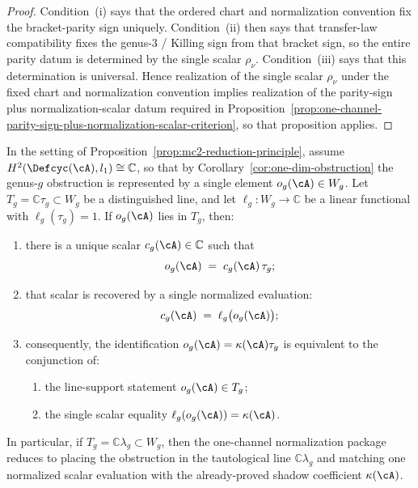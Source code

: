 \begin{proof}
Condition~\textup{(i)} says that the ordered chart and normalization
convention fix the bracket-parity sign uniquely.  Condition~\textup{(ii)}
then says that transfer-law compatibility fixes the genus-$3$ /
Killing sign from that bracket sign, so the entire parity datum is
determined by the single scalar
$\rho_{\nu}$.
Condition~\textup{(iii)} says that this determination is universal.
Hence realization of the single scalar
$\rho_{\nu}$
under the fixed chart and normalization convention implies realization
of the parity-sign plus normalization-scalar datum required in
Proposition~\ref{prop:one-channel-parity-sign-plus-normalization-scalar-criterion},
so that proposition applies.
\end{proof}

\begin{proposition}\label{prop:one-channel-normalization-criterion}
In the setting of
Proposition~\textup{\ref{prop:mc2-reduction-principle}}, assume
$H^2(\Defcyc(\cA), l_1) \cong \mathbb{C}$, so that by
Corollary~\textup{\ref{cor:one-dim-obstruction}} the genus-$g$
obstruction is represented by a single element
$o_g(\cA) \in W_g$.
Let $T_g = \mathbb{C}\tau_g \subset W_g$ be a distinguished line, and
let $\ell_g\colon W_g \to \mathbb{C}$ be a linear functional with
$\ell_g(\tau_g)=1$.
If $o_g(\cA)$ lies in $T_g$, then:
\begin{enumerate}[label=\textup{(\roman*)}]
\item there is a unique scalar $c_g(\cA) \in \mathbb{C}$ such that
  \[
  o_g(\cA) \;=\; c_g(\cA)\,\tau_g;
  \]
\item that scalar is recovered by a single normalized evaluation:
  \[
  c_g(\cA) \;=\; \ell_g\bigl(o_g(\cA)\bigr);
  \]
\item consequently, the identification
  $o_g(\cA)=\kappa(\cA)\tau_g$ is equivalent to the conjunction of:
  \begin{enumerate}[label=\textup{(\alph*)}]
  \item the line-support statement $o_g(\cA)\in T_g$;
  \item the single scalar equality
    $\ell_g(o_g(\cA))=\kappa(\cA)$.
  \end{enumerate}
\end{enumerate}
In particular, if $T_g=\mathbb{C}\lambda_g \subset W_g$, then the
one-channel normalization package reduces to placing the obstruction in
the tautological line $\mathbb{C}\lambda_g$ and matching one normalized
scalar evaluation with the already-proved shadow coefficient
$\kappa(\cA)$.
\end{proposition}

